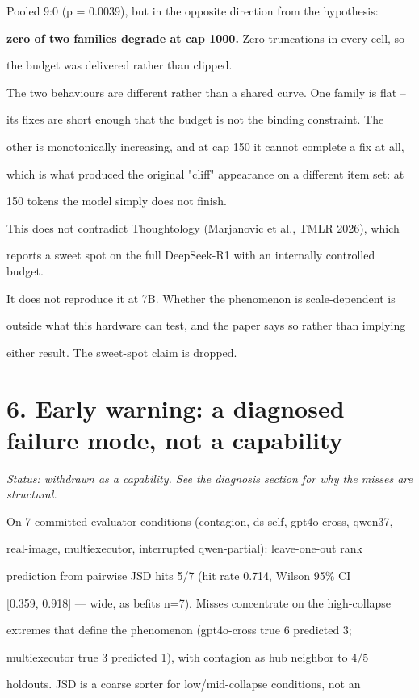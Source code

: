 \documentclass[11pt]{article}
\begin{document}
Pooled 9:0 (p = 0.0039), but in the opposite direction from the hypothesis:

{\bf zero of two families degrade at cap 1000.} Zero truncations in every cell, so

the budget was delivered rather than clipped.


The two behaviours are different rather than a shared curve. One family is flat --

its fixes are short enough that the budget is not the binding constraint. The

other is monotonically increasing, and at cap 150 it cannot complete a fix at all,

which is what produced the original "cliff" appearance on a different item set: at

150 tokens the model simply does not finish.


This does not contradict Thoughtology (Marjanovic et al., TMLR 2026), which

reports a sweet spot on the full DeepSeek-R1 with an internally controlled budget.

It does not reproduce it at 7B. Whether the phenomenon is scale-dependent is

outside what this hardware can test, and the paper says so rather than implying

either result. The sweet-spot claim is dropped.


\section*{6. Early warning: a diagnosed failure mode, not a capability}

{\it Status: withdrawn as a capability. See the diagnosis section for why the misses are structural.}


On 7 committed evaluator conditions (contagion, ds-self, gpt4o-cross, qwen37,

real-image, multiexecutor, interrupted qwen-partial): leave-one-out rank

prediction from pairwise JSD hits 5/7 (hit rate 0.714, Wilson 95\% CI

[0.359, 0.918] --- wide, as befits n=7). Misses concentrate on the high-collapse

extremes that define the phenomenon (gpt4o-cross true 6 predicted 3;

multiexecutor true 3 predicted 1), with contagion as hub neighbor to 4/5

holdouts. JSD is a coarse sorter for low/mid-collapse conditions, not an
\end{document}
